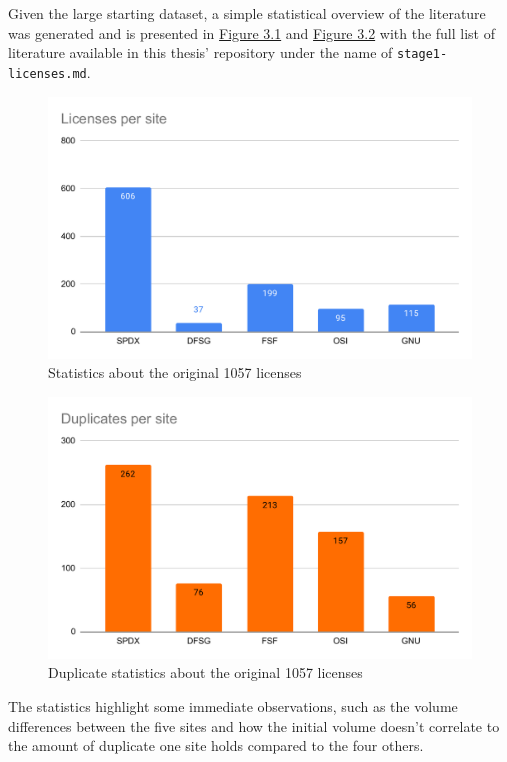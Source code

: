 Given the large starting dataset, a simple statistical overview of the literature was generated and is presented in \hyperref[fig:3-1]{Figure 3.1} and \hyperref[fig:3-2]{Figure 3.2} with the full list of literature available in this thesis' repository \citep{mscthesis} under the name of \texttt{stage1-licenses.md}.
\begin{figure}
	\centering
	\includegraphics[scale=0.76]{figures/figure-3-1.pdf}
	\caption{Statistics about the original 1057 licenses}
	\label{fig:3-1}
\end{figure}
\begin{figure}
	\centering
	\includegraphics[scale=0.76]{figures/figure-3-2.pdf}
	\caption{Duplicate statistics about the original 1057 licenses}
	\label{fig:3-2}
\end{figure}
The statistics highlight some immediate observations, such as the volume differences between the five sites and how the initial volume doesn't correlate to the amount of duplicate one site holds compared to the four others.

